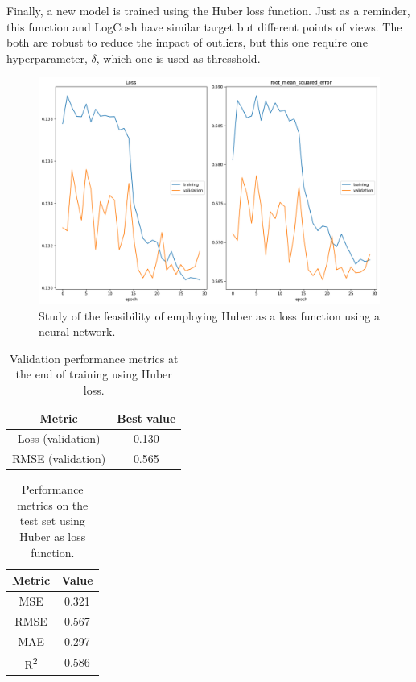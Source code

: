 Finally, a new model is trained using the Huber loss function. Just as a reminder, this function and LogCosh have similar target but different points of views. The both are robust to reduce the impact of outliers, but this one require one hyperparameter, \(\delta\), which one is used as thresshold.



\begin{figure}[H]
    \centering
    \includegraphics[width=1\textwidth]{figures/neural_net_regression_research/train_huber_net.png}
    \caption{Study of the feasibility of employing Huber as a loss function using a neural network.}
    \label{fig:huber_reg_net_train}
\end{figure}

\begin{table}[h]
    \centering
    \begin{tabular}{|c|c|}
    \hline
    \textbf{Metric} & \textbf{Best value} \\
    \hline
    Loss (validation)  & 0.130 \\
    RMSE (validation)  & 0.565 \\
    \hline
    \end{tabular}
    \caption{Validation performance metrics at the end of training using Huber loss.}
    \label{tab:loss-rmse-validation-huber}
\end{table}

\begin{table}[H]
    \centering
    \begin{tabular}{|c|c|}
    \hline
    \textbf{Metric} & \textbf{Value} \\
    \hline
    MSE & 0.321 \\
    RMSE & 0.567 \\
    MAE & 0.297 \\
    R\textsuperscript{2} & 0.586 \\
    \hline
    \end{tabular}
    \caption{Performance metrics on the test set using Huber as loss function.}
    \label{tab:test_metrics}
\end{table}


